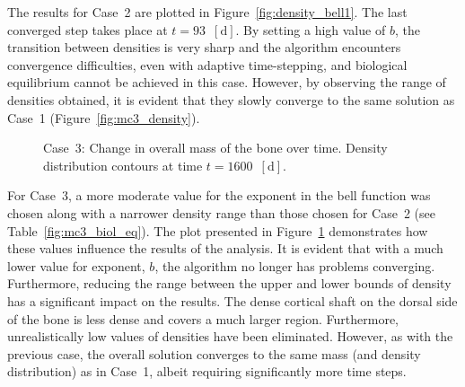 \documentclass[review]{elsarticle}
\numberwithin{equation}{section}
\begin{document}
The results for Case~2 are plotted in Figure~\ref{fig:density_bell1}.
The last converged step takes place at $t=93$~$[{\text{d}}]$. 
By setting a high value of $b$, the transition between densities is very sharp and the algorithm encounters convergence difficulties, even with adaptive time-stepping, and biological equilibrium cannot be achieved in this case. 
However, by observing the range of densities obtained, it is evident that they slowly converge to the same solution as Case~1 (Figure~\ref{fig:mc3_density}). 
\begin{figure}[h!]
\centering
	
		\caption{Case~3: Change in overall mass of the bone over time. Density distribution contours at time $t=1600$~$[{\text{d}}]$.}
		\label{fig:density_bell2}
\end{figure}

For Case~3, a more moderate value for the exponent in the bell function was chosen along with a narrower density range than those chosen for Case~2 (see Table~\ref{fig:mc3_biol_eq}).
The plot presented in Figure~\ref{fig:density_bell2} demonstrates how these values influence the results of the analysis. 
It is evident that with a much lower value for exponent, $b$, the algorithm no longer has problems converging. 
Furthermore,  reducing the range between the upper and lower bounds of density has a significant impact on the results. 
The dense cortical shaft on the dorsal side of the bone is less dense and covers a much larger region. 
Furthermore, unrealistically low values of densities have been eliminated. 
However, as with the previous case, the overall solution converges to the same mass (and density distribution) as in Case~1, albeit requiring significantly more time steps. \\
\end{document}

